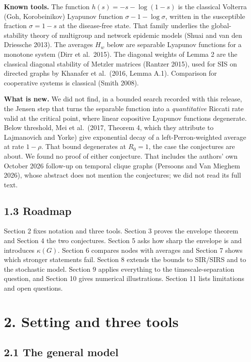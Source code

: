 \documentclass[
  11pt,
  a4paper,
]{article}
\begin{document}
\textbf{Known tools.} The function \(h(s)=-s-\log(1-s)\) is the
classical Volterra (Goh, Korobeinikov) Lyapunov function
\(\sigma-1-\log\sigma\), written in the susceptible fraction
\(\sigma=1-s\) at the disease-free state. That family underlies the
global-stability theory of multigroup and network epidemic models (Shuai
and van den Driessche 2013). The averages \(H_w\) below are separable
Lyapunov functions for a monotone system (Dirr et al.~2015). The
diagonal weights of Lemma 2 are the classical diagonal stability of
Metzler matrices (Rantzer 2015), used for SIS on directed graphs by
Khanafer et al.~(2016, Lemma A.1). Comparison for cooperative systems is
classical (Smith 2008).

\textbf{What is new.} We did not find, in a bounded search recorded with
this release, the Jensen step that turns the separable function into a
\emph{quantitative} Riccati rate valid at the critical point, where
linear copositive Lyapunov functions degenerate. Below threshold, Mei et
al.~(2017, Theorem 4, which they attribute to Lajmanovich and Yorke)
give exponential decay of a left-Perron-weighted average at rate
\(1-\rho\). That bound degenerates at \(R_0=1\), the case the
conjectures are about. We found no proof of either conjecture. That
includes the authors' own October 2026 follow-up on temporal clique
graphs (Persoons and Van Mieghem 2026), whose abstract does not mention
the conjectures; we did not read its full text.

\subsection{1.3 Roadmap}\label{roadmap}

Section 2 fixes notation and three tools. Section 3 proves the envelope
theorem and Section 4 the two conjectures. Section 5 asks how sharp the
envelope is and introduces \(\kappa(G)\). Section 6 compares nodes with
averages and Section 7 shows which stronger statements fail. Section 8
extends the bounds to SIR/SIRS and to the stochastic model. Section 9
applies everything to the timescale-separation question, and Section 10
gives numerical illustrations. Section 11 lists limitations and open
questions.

\section{2. Setting and three tools}\label{setting-and-three-tools}

\subsection{2.1 The general model}\label{the-general-model}
\end{document}
